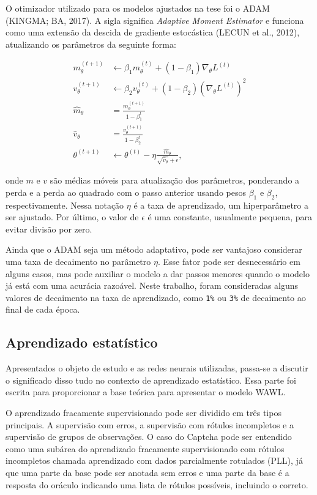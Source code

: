\documentclass[12pt,twoside,brazilian]{book}
\begin{document}
O otimizador utilizado para os modelos ajustados na tese foi o ADAM
(KINGMA; BA, 2017). A sigla significa \emph{Adaptive Moment Estimator} e
funciona como uma extensão da descida de gradiente estocástica (LECUN et
al., 2012), atualizando os parâmetros da seguinte forma:

\[
\begin{array}{cl}
m_{\theta}^{(t+1)} &\leftarrow \beta_1m_{\theta}^{(t)} + (1-\beta_1)\nabla_\theta L^{(t)} \\
v_{\theta}^{(t+1)} &\leftarrow \beta_2v_{\theta}^{(t)} + (1-\beta_2)(\nabla_\theta L^{(t)})^2 \\
\hat{m}_{\theta} &= \frac{m_\theta^{(t+1)}}{1-\beta_1^t} \\
\hat{v}_{\theta} &= \frac{v_\theta^{(t+1)}}{1-\beta_2^t} \\
\theta^{(t+1)} &\leftarrow \theta^{(t)} - \eta \frac{\hat{m}_{\theta}}{\sqrt{\hat{v}_{\theta}} + \epsilon},
\end{array}
\]

onde \(m\) e \(v\) são médias móveis para atualização dos parâmetros,
ponderando a perda e a perda ao quadrado com o passo anterior usando
pesos \(\beta_1\) e \(\beta_2\), respectivamente. Nessa notação \(\eta\)
é a taxa de aprendizado, um hiperparâmetro a ser ajustado. Por último, o
valor de \(\epsilon\) é uma constante, usualmente pequena, para evitar
divisão por zero.

Ainda que o ADAM seja um método adaptativo, pode ser vantajoso
considerar uma taxa de decaimento no parâmetro \(\eta\). Esse fator pode
ser desnecessário em alguns casos, mas pode auxiliar o modelo a dar
passos menores quando o modelo já está com uma acurácia razoável. Neste
trabalho, foram consideradas alguns valores de decaimento na taxa de
aprendizado, como \texttt{1\%} ou \texttt{3\%} de decaimento ao final de
cada época.

\hypertarget{sec-aprendizado-estatistico}{%
\subsection{Aprendizado estatístico}\label{sec-aprendizado-estatistico}}

Apresentados o objeto de estudo e as redes neurais utilizadas, passa-se
a discutir o significado disso tudo no contexto de aprendizado
estatístico. Essa parte foi escrita para proporcionar a base teórica
para apresentar o modelo WAWL.

O aprendizado fracamente supervisionado pode ser dividido em três tipos
principais. A supervisão com erros, a supervisão com rótulos incompletos
e a supervisão de grupos de observações. O caso do Captcha pode ser
entendido como uma subárea do aprendizado fracamente supervisionado com
rótulos incompletos chamada aprendizado com dados parcialmente rotulados
(PLL), já que uma parte da base pode ser anotada sem erros e uma parte
da base é a resposta do oráculo indicando uma lista de rótulos
possíveis, incluindo o correto.
\end{document}
